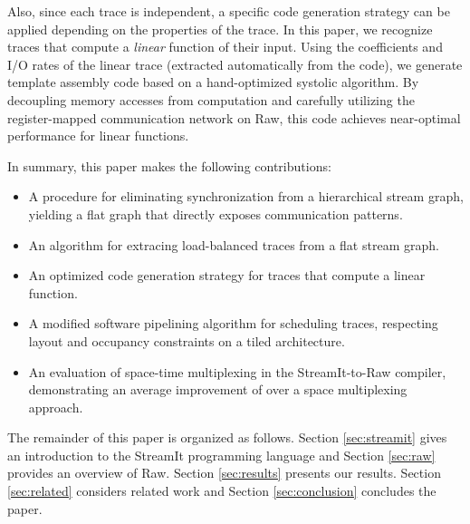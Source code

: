Also, since each trace is independent, a specific code generation
strategy can be applied depending on the properties of the trace.  In
this paper, we recognize traces that compute a {\it linear} function
of their input.  Using the coefficients and I/O rates of the linear
trace (extracted automatically from the code), we generate template
assembly code based on a hand-optimized systolic algorithm.  By
decoupling memory accesses from computation and carefully utilizing
the register-mapped communication network on Raw, this code achieves
near-optimal performance for linear functions.

In summary, this paper makes the following contributions:

\begin{itemize}
\item A procedure for eliminating synchronization from a hierarchical
stream graph, yielding a flat graph that directly exposes
communication patterns.
\item An algorithm for extracing load-balanced traces from a flat
stream graph.
\item An optimized code generation strategy for traces that compute a
linear function.
\item A modified software pipelining algorithm for scheduling traces,
respecting layout and occupancy constraints on a tiled architecture.
\item An evaluation of space-time multiplexing in the StreamIt-to-Raw
compiler, demonstrating an average improvement of  over a
space multiplexing approach.
\end{itemize}

The remainder of this paper is organized as follows.  Section
\ref{sec:streamit} gives an introduction to the StreamIt programming
language and Section \ref{sec:raw} provides an overview of
Raw.  Section \ref{sec:results} presents our results.
Section \ref{sec:related} considers related work and Section
\ref{sec:conclusion} concludes the paper.


